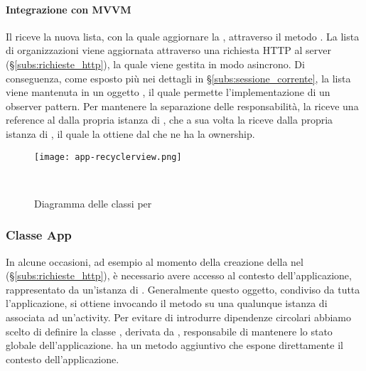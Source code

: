 \documentclass[../../manuale-manutentore.tex]{subfiles}
\begin{document}

\paragraph{Integrazione con MVVM}%
\label{par:integrazione_con_mvvm}

Il  riceve la nuova lista, con la quale aggiornare la , attraverso il metodo \linebreak{}.
La lista di organizzazioni viene aggiornata attraverso una richiesta HTTP al server (§\ref{subs:richieste_http}), la quale viene gestita in modo asincrono.
Di conseguenza, come esposto più nei dettagli in §\ref{subs:sessione_corrente}, la lista viene mantenuta in un oggetto , il quale permette l'implementazione di un observer pattern.
Per mantenere la separazione delle responsabilità, la  riceve una reference al  dalla propria istanza di , che a sua volta la riceve dalla propria istanza di , il quale la ottiene dal  che ne ha la ownership.

\begin{figure}[ht]
  \centering
  \texttt{[image: app-recyclerview.png]}
  \caption{Diagramma delle classi per }
~~\label{fig:app/diagramma_classi_recyclerview}
\end{figure}

\subsubsection{Classe App}%
\label{subs:classe_app}

In alcune occasioni, ad esempio al momento della creazione della  nel  (§\ref{subs:richieste_http}), è necessario avere accesso al contesto dell'applicazione, rappresentato da un'istanza di .
Generalmente questo oggetto, condiviso da tutta l'applicazione, si ottiene invocando il metodo  su una qualunque istanza di  associata ad un'activity.
Per evitare di introdurre dipendenze circolari abbiamo scelto di definire la classe , derivata da , responsabile di mantenere lo stato globale dell'applicazione.
 ha un metodo aggiuntivo  che espone direttamente il contesto dell'applicazione.
\end{document}
